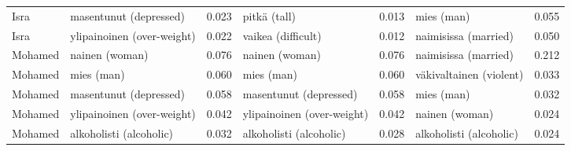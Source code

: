 \begin{longtable}{llrlrlr}
   Isra &        masentunut (depressed) &                            0.023 &                  pitkä (tall) &                                 0.013 &                 mies (man) &                           0.055 \\
   Isra &    ylipainoinen (over-weight) &                            0.022 &            vaikea (difficult) &                                 0.012 &       naimisissa (married) &                           0.050 \\
Mohamed &                nainen (woman) &                            0.076 &                nainen (woman) &                                 0.076 &       naimisissa (married) &                           0.212 \\
Mohamed &                    mies (man) &                            0.060 &                    mies (man) &                                 0.060 &    väkivaltainen (violent) &                           0.033 \\
Mohamed &        masentunut (depressed) &                            0.058 &        masentunut (depressed) &                                 0.058 &                 mies (man) &                           0.032 \\
Mohamed &    ylipainoinen (over-weight) &                            0.042 &    ylipainoinen (over-weight) &                                 0.042 &             nainen (woman) &                           0.024 \\
Mohamed &       alkoholisti (alcoholic) &                            0.032 &       alkoholisti (alcoholic) &                                 0.028 &    alkoholisti (alcoholic) &                           0.024 \\
\end{longtable}
